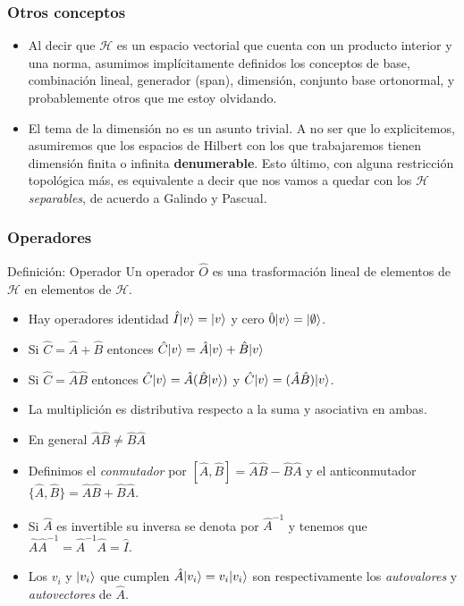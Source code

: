 \documentclass{beamer}
\begin{document}
    \begin{frame}
        \frametitle{Otros conceptos}
        \begin{itemize}
        \item Al decir que $\mathcal{H}$ es un espacio vectorial que cuenta con un producto interior y una norma, asumimos implícitamente definidos los conceptos de base, combinación lineal, generador (span), dimensión, conjunto base ortonormal, y probablemente otros que me estoy olvidando.
        \item El tema de la dimensión no es un asunto trivial. A no ser que lo explicitemos, asumiremos que los espacios de Hilbert con los que trabajaremos tienen dimensión finita o infinita {\bf denumerable}. Esto último, con alguna restricción topológica más, es equivalente a decir que nos vamos a quedar con los $\mathcal{H}$ {\em separables}, de acuerdo a Galindo y Pascual.
        \end{itemize}
        
    \end{frame}
    
    \begin{frame}
        \frametitle{Operadores}
        \begin{block}{Definición: Operador}
            Un operador $\hat{O}$ es una trasformación lineal de elementos de $\mathcal{H}$ en elementos de $\mathcal{H}$.
        \end{block}
        \begin{itemize}
            \item Hay operadores identidad $\hat{I}| v \rangle=| v \rangle$ y cero $\hat{0}| v \rangle=| \emptyset \rangle$.
            \item Si $\hat{C}=\hat{A}+\hat{B}$ entonces $\hat{C}| v \rangle=\hat{A}| v \rangle+\hat{B}| v \rangle$
            \item Si $\hat{C}=\hat{A}\hat{B}$ entonces $\hat{C}| v \rangle=\hat{A}(\hat{B}| v \rangle)$ y $\hat{C}| v \rangle=(\hat{A}\hat{B})| v \rangle$.
            \item La multiplición es distributiva respecto a la suma y asociativa en ambas.
            \item En general $\hat{A}\hat{B}\neq \hat{B}\hat{A}$
            \item Definimos el {\em conmutador} por $[\hat{A},\hat{B}]=\hat{A}\hat{B}-\hat{B}\hat{A}$
            y el anticonmutador $\{\hat{A},\hat{B}\}=\hat{A}\hat{B}+\hat{B}\hat{A}$.
            \item Si $\hat{A}$ es invertible su inversa se denota por $\hat{A}^{-1}$ y tenemos que 
            $\hat{A}\hat{A}^{-1}=\hat{A}^{-1}\hat{A}=\hat{I}$.
            \item Los $v_i$ y $| v_i \rangle$ que cumplen $\hat{A}| v_i \rangle=v_i| v_i \rangle$ son respectivamente los {\em autovalores} y {\em autovectores} de $\hat{A}$.
        \end{itemize}
        
    \end{frame}
    
\end{document}
